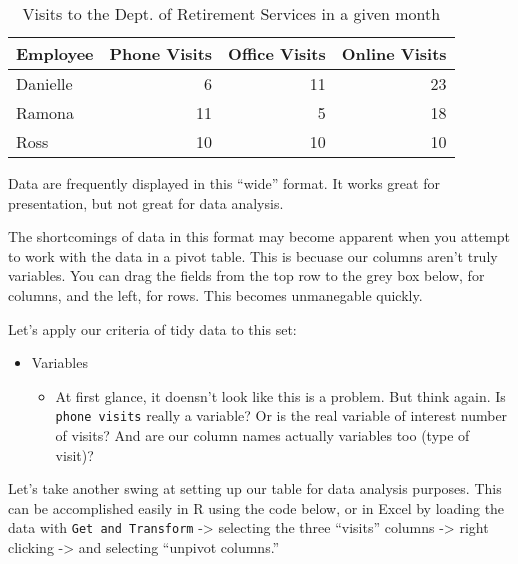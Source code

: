 \documentclass[]{book}
\newenvironment{Shaded}{\begin{snugshade}}{\end{snugshade}}
\newcommand{\DataTypeTok}[1]{\textcolor[rgb]{0.13,0.29,0.53}{#1}}
\newcommand{\KeywordTok}[1]{\textcolor[rgb]{0.13,0.29,0.53}{\textbf{#1}}}
\newcommand{\NormalTok}[1]{#1}
\newcommand{\OperatorTok}[1]{\textcolor[rgb]{0.81,0.36,0.00}{\textbf{#1}}}
\newcommand{\StringTok}[1]{\textcolor[rgb]{0.31,0.60,0.02}{#1}}
\providecommand{\tightlist}{%
  \setlength{\itemsep}{0pt}\setlength{\parskip}{0pt}}
\begin{document}
\begin{table}

\caption{\label{tab:tables-visits}Visits to the Dept. of Retirement Services in a given month}
\centering
\begin{tabular}[t]{l|r|r|r}
\hline
Employee & Phone Visits & Office Visits & Online Visits\\
\hline
Danielle & 6 & 11 & 23\\
\hline
Ramona & 11 & 5 & 18\\
\hline
Ross & 10 & 10 & 10\\
\hline
\end{tabular}
\end{table}

Data are frequently displayed in this ``wide'' format. It works great for presentation, but not great for data analysis.

The shortcomings of data in this format may become apparent when you attempt to work with the data in a pivot table. This is becuase our columns aren't truly variables. You can drag the fields from the top row to the grey box below, for columns, and the left, for rows. This becomes unmanegable quickly.

\begin{Shaded}
\end{Shaded}

\hypertarget{htmlwidget-3c580058b62579833746}{}

Let's apply our criteria of tidy data to this set:

\begin{itemize}
\tightlist
\item
  Variables

  \begin{itemize}
  \tightlist
  \item
    At first glance, it doensn't look like this is a problem. But think again. Is \texttt{phone\ visits} really a variable? Or is the real variable of interest number of visits? And are our column names actually variables too (type of visit)?
  \end{itemize}
\end{itemize}

Let's take another swing at setting up our table for data analysis purposes. This can be accomplished easily in R using the code below, or in Excel by loading the data with \texttt{Get\ and\ Transform} -\textgreater{} selecting the three ``visits'' columns -\textgreater{} right clicking -\textgreater{} and selecting ``unpivot columns.''
\end{document}
